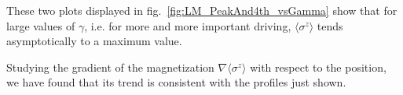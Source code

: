 These two plots displayed in fig.~\ref{fig:LM_PeakAnd4th_vsGamma} show that for large values of $\gamma$, i.e. for more and more important driving, $\langle\sigma^z\rangle$ tends asymptotically to a maximum value.

Studying the gradient of the magnetization $\nabla \langle \sigma^z \rangle$ with respect to the position, we have found that its trend is consistent with the profiles just shown.






